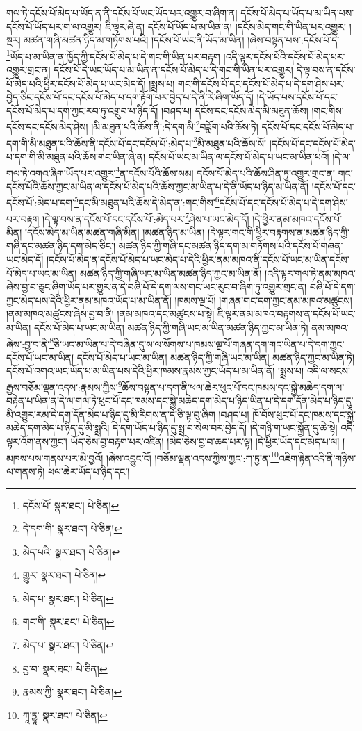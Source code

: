 གལ་ཏེ་དངོས་པོ་མེད་པ་ཡོད་ན་ནི་དངོས་པོ་ཡང་ཡོད་པར་འགྱུར་བ་ཞིག་ན། དངོས་པོ་མེད་པ་ཡོད་པ་མ་ཡིན་པས་དངོས་པོ་ཡོད་པར་ག་ལ་འགྱུར། ཇི་ལྟར་ཞེ་ན། དངོས་པོ་ཡོད་པ་མ་ཡིན་ན། །དངོས་མེད་གང་གི་ཡིན་པར་འགྱུར། །སྔར། མཚན་གཞི་མཚན་ཉིད་མ་གཏོགས་པའི། །དངོས་པོ་ཡང་ནི་ཡོད་མ་ཡིན། །ཞེས་བསྟན་པས་:དངོས་པོ་དེ་\footnote{དངོས་པོ་  སྣར་ཐང་།  པེ་ཅིན། }ཡོད་པ་མ་ཡིན་ན་ཁྱོད་ཀྱི་དངོས་པོ་མེད་པ་དེ་གང་གི་ཡིན་པར་བརྟག །འདི་ལྟར་དངོས་པོའི་དངོས་པོ་མེད་པར་འགྱུར་གྲང་ན། དངོས་པོ་དེ་ཡང་ཡོད་པ་མ་ཡིན་ན་དངོས་པོ་མེད་པ་དེ་གང་གི་ཡིན་པར་འགྱུར། དེ་ལྟ་བས་ན་དངོས་པོ་མེད་པའི་ཕྱིར་དངོས་པོ་མེད་པ་ཡང་མེད་དོ། །སྨྲས་པ། གང་གི་དངོས་པོ་དང་དངོས་པོ་མེད་པ་དེ་དག་ཤེས་པར་བྱེད་ཅིང་དངོས་པོ་དང་དངོས་པོ་མེད་པ་དག་རྟོག་པར་བྱེད་པ་དེ་ནི་རེ་ཞིག་ཡོད་དོ། །དེ་ཡོད་པས་དངོས་པོ་དང་དངོས་པོ་མེད་པ་དག་ཀྱང་རབ་ཏུ་འགྲུབ་པ་ཉིད་དོ། །བཤད་པ། དངོས་དང་དངོས་མེད་མི་མཐུན་ཆོས། །གང་གིས་དངོས་དང་དངོས་མེད་ཤེས། །མི་མཐུན་པའི་ཆོས་ནི་:དེ་དག་མི་\footnote{དེ་དག་གི་  སྣར་ཐང་།  པེ་ཅིན། }བཟློག་པའི་ཆོས་ཏེ། དངོས་པོ་དང་དངོས་པོ་མེད་པ་དག་གི་མི་མཐུན་པའི་ཆོས་ནི་དངོས་པོ་དང་དངོས་པོ་:མེད་པ་\footnote{མེད་པའི་  སྣར་ཐང་།  པེ་ཅིན། }མི་མཐུན་པའི་ཆོས་སོ། །དངོས་པོ་དང་དངོས་པོ་མེད་པ་དག་གི་མི་མཐུན་པའི་ཆོས་གང་ཡིན་ཞེ་ན། དངོས་པོ་ཡང་མ་ཡིན་ལ་དངོས་པོ་མེད་པ་ཡང་མ་ཡིན་པའོ། །དེ་ལ་གལ་ཏེ་འགའ་ཞིག་ཡོད་པར་འགྱུར་\footnote{གྱུར་  སྣར་ཐང་།  པེ་ཅིན། }ན་དངོས་པོའི་ཆོས་སམ། དངོས་པོ་མེད་པའི་ཆོས་ཤིན་ཏུ་འགྱུར་གྲང་ན། གང་དངོས་པོའི་ཆོས་ཀྱང་མ་ཡིན་ལ་དངོས་པོ་མེད་པའི་ཆོས་ཀྱང་མ་ཡིན་པ་དེ་ནི་ཡོད་པ་ཉིད་མ་ཡིན་ནོ། །དངོས་པོ་དང་དངོས་པོ་:མེད་པ་དག་\footnote{མེད་པ་  སྣར་ཐང་།  པེ་ཅིན། }དང་མི་མཐུན་པའི་ཆོས་དེ་མེད་ན་:གང་གིས་\footnote{གང་གི་  སྣར་ཐང་།  པེ་ཅིན། }དངོས་པོ་དང་དངོས་པོ་མེད་པ་དེ་དག་ཤེས་པར་བརྟག །དེ་ལྟ་བས་ན་དངོས་པོ་དང་དངོས་པོ་:མེད་པར་\footnote{མེད་པ་  སྣར་ཐང་།  པེ་ཅིན། }ཤེས་པ་ཡང་མེད་དོ། །དེ་ཕྱིར་ནམ་མཁའ་དངོས་པོ་མིན། །དངོས་མེད་མ་ཡིན་མཚན་གཞི་མིན། །མཚན་ཉིད་མ་ཡིན། །དེ་ལྟར་གང་གི་ཕྱིར་བརྟགས་ན་མཚན་ཉིད་ཀྱི་གཞི་དང་མཚན་ཉིད་དག་མེད་ཅིང་། མཚན་ཉིད་ཀྱི་གཞི་དང་མཚན་ཉིད་དག་མ་གཏོགས་པའི་དངོས་པོ་གཞན་ཡང་མེད་དོ། །དངོས་པོ་མེད་ན་དངོས་པོ་མེད་པ་ཡང་མེད་པ་དེའི་ཕྱིར་ནམ་མཁའ་ནི་དངོས་པོ་ཡང་མ་ཡིན་དངོས་པོ་མེད་པ་ཡང་མ་ཡིན། མཚན་ཉིད་ཀྱི་གཞི་ཡང་མ་ཡིན་མཚན་ཉིད་ཀྱང་མ་ཡིན་ནོ། །འདི་ལྟར་གལ་ཏེ་ནམ་མཁའ་ཞེས་བྱ་བ་ཅུང་ཞིག་ཡོད་པར་གྱུར་ན་དེ་བཞི་པོ་དེ་དག་ལས་གང་ཡང་རུང་བ་ཞིག་ཏུ་འགྱུར་གྲང་ན། བཞི་པོ་དེ་དག་ཀྱང་མེད་པས་དེའི་ཕྱིར་ནམ་མཁའ་ཡོད་པ་མ་ཡིན་ནོ། །ཁམས་ལྔ་པོ། །གཞན་གང་དག་ཀྱང་ནམ་མཁའ་མཚུངས། །ནམ་མཁའ་མཚུངས་ཞེས་བྱ་བ་ནི། །ནམ་མཁའ་དང་མཚུངས་པ་སྟེ། ཇི་ལྟར་ནམ་མཁའ་བརྟགས་ན་དངོས་པོ་ཡང་མ་ཡིན། དངོས་པོ་མེད་པ་ཡང་མ་ཡིན། མཚན་ཉིད་ཀྱི་གཞི་ཡང་མ་ཡིན་མཚན་ཉིད་ཀྱང་མ་ཡིན་ཏེ། ནམ་མཁའ་ཞེས་:བྱ་བ་ནི་\footnote{བྱ་བ་  སྣར་ཐང་།  པེ་ཅིན། }ཅི་ཡང་མ་ཡིན་པ་དེ་བཞིན་དུ་ས་ལ་སོགས་པ་ཁམས་ལྔ་པོ་གཞན་དག་གང་ཡིན་པ་དེ་དག་ཀྱང་དངོས་པོ་ཡང་མ་ཡིན། དངོས་པོ་མེད་པ་ཡང་མ་ཡིན། མཚན་ཉིད་ཀྱི་གཞི་ཡང་མ་ཡིན། མཚན་ཉིད་ཀྱང་མ་ཡིན་ཏེ། དངོས་པོ་འགའ་ཡང་ཡོད་པ་མ་ཡིན་པས་དེའི་ཕྱིར་ཁམས་རྣམས་ཀྱང་ཡོད་པ་མ་ཡིན་ནོ། །སྨྲས་པ། འདི་ལ་སངས་རྒྱས་བཅོམ་ལྡན་འདས་:རྣམས་ཀྱིས་\footnote{རྣམས་ཀྱི་  སྣར་ཐང་།  པེ་ཅིན། }ཆོས་བསྟན་པ་དག་ནི་ཕལ་ཆེར་ཕུང་པོ་དང་ཁམས་དང་སྐྱེ་མཆེད་དག་ལ་བརྟེན་པ་ཡིན་ན་དེ་ལ་གལ་ཏེ་ཕུང་པོ་དང་ཁམས་དང་སྐྱེ་མཆེད་དག་མེད་པ་ཉིད་ཡིན་པ་དེ་དག་དོན་མེད་པ་ཉིད་དུ་མི་འགྱུར་རམ་དེ་དག་དོན་མེད་པ་ཉིད་དུ་མི་རིགས་ན་དེ་ཅི་ལྟ་བུ་ཞིག །བཤད་པ། ཁོ་བོས་ཕུང་པོ་དང་ཁམས་དང་སྐྱེ་མཆེད་དག་མེད་པ་ཉིད་དུ་མི་སྨྲའི། དེ་དག་ཡོད་པ་ཉིད་དུ་སྨྲ་བ་སེལ་བར་བྱེད་དོ། །དེ་གཉི་ག་ཡང་སྐྱོན་དུ་ཆེ་སྟེ། འདི་ལྟར་འོག་ནས་ཀྱང་། ཡོད་ཅེས་བྱ་བརྟག་པར་འཛིན། །མེད་ཅེས་བྱ་བ་ཆད་པར་ལྟ། །དེ་ཕྱིར་ཡོད་དང་མེད་པ་ལ། །མཁས་པས་གནས་པར་མི་བྱའོ། །ཞེས་འབྱུང་ངོ། །བཅོམ་ལྡན་འདས་ཀྱིས་ཀྱང་:ཀ་ཏྱ་ན་\footnote{ཀཱ་ཏྱཱ་  སྣར་ཐང་།  པེ་ཅིན། }འཇིག་རྟེན་འདི་ནི་གཉིས་ལ་གནས་ཏེ། ཕལ་ཆེར་ཡོད་པ་ཉིད་དང་། 